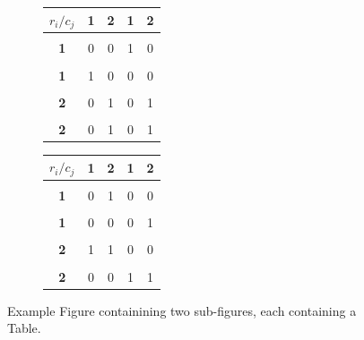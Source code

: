 \documentclass{article}
\begin{document}
\begin{figure}[htb]
\captionsetup{width = 15cm}
\centering
  \begin{subfigure}{0.4\textwidth}
  \centering
  \begin{tabular}{c|c|c|c|c|}
         $r_i / c_j$ & \textbf{1} & \textbf{2} & \textbf{1} & \textbf{2}\\[5pt]
         \hline
         &&&&\\[-5pt]
         \textbf{1} & 0 & 0 & 1 & 0 \\[5pt]
         \hline
         &&&&\\[-5pt]
         \textbf{1}& 1 & 0 & 0 & 0 \\[5pt]
         \hline
         &&&&\\[-5pt]
         \textbf{2}& 0 & 1 & 0 & 1 \\[5pt]
         \hline
         &&&&\\[-5pt]
         \textbf{2} & 0 & 1 & 0 & 1 \\[5pt]
         \hline
    \end{tabular}
  \caption{}
  \end{subfigure}
  \begin{subfigure}{0.32\textwidth}
  \centering
  \begin{tabular}{c|c|c|c|c|}
         $r_i / c_j$ & \textbf{1} & \textbf{2} & \textbf{1} & \textbf{2}\\[5pt]
         \hline
         &&&&\\[-5pt]
         \textbf{1}& 0 & 1 & 0 & 0 \\[5pt]
         \hline
         &&&&\\[-5pt]
         \textbf{1}& 0 & 0 & 0 & 1 \\[5pt]
         \hline
         &&&&\\[-5pt]
         \textbf{2}& 1 & 1 & 0 & 0 \\[5pt]
         \hline
         &&&&\\[-5pt]
         \textbf{2}& 0 & 0 & 1 & 1 \\[5pt]
         \hline
    \end{tabular}
  \caption{}
\end{subfigure}
\caption{Example Figure containining two sub-figures, each containing a Table.}
\label{fig:Example_Figure_With_Two_Subfigure_Tables}
\end{figure}



\printbibliography
\end{document}
